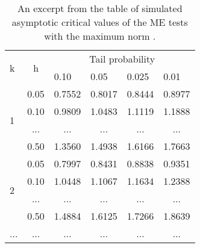 \documentclass[main.tex]{subfiles}
\begin{document}
\begin{table}[]
\centering
\begin{tabular}{|l|l|l|l|l|l|}
\hline
\multirow{2}{*}{k}        & \multicolumn{1}{c|}{\multirow{2}{*}{h}} & \multicolumn{4}{c|}{Tail probability}                                                                     \\ \cline{3-6} 
                          & \multicolumn{1}{c|}{}                   & 0.10                     & 0.05                     & 0.025                    & 0.01                     \\ \hline
\multirow{4}{*}{1}        & 0.05                                    & 0.7552                   & 0.8017                   & 0.8444                   & 0.8977                   \\ \cline{2-6} 
                          & 0.10                                    & 0.9809                   & 1.0483                   & 1.1119                   & 1.1888                   \\ \cline{2-6} 
                          & \multicolumn{1}{c|}{...}                & \multicolumn{1}{c|}{...} & \multicolumn{1}{c|}{...} & \multicolumn{1}{c|}{...} & \multicolumn{1}{c|}{...} \\ \cline{2-6} 
                          & 0.50                                    & 1.3560                   & 1.4938                   & 1.6166                   & 1.7663                   \\ \hline
\multirow{4}{*}{2}        & 0.05                                    & 0.7997                   & 0.8431                   & 0.8838                   & 0.9351                   \\ \cline{2-6} 
                          & 0.10                                    & 1.0448                   & 1.1067                   & 1.1634                   & 1.2388                   \\ \cline{2-6} 
                          & \multicolumn{1}{c|}{...}                & \multicolumn{1}{c|}{...} & \multicolumn{1}{c|}{...} & \multicolumn{1}{c|}{...} & \multicolumn{1}{c|}{...} \\ \cline{2-6} 
                          & 0.50                                    & 1.4884                   & 1.6125                   & 1.7266                   & 1.8639                   \\ \hline
\multicolumn{1}{|c|}{...} & \multicolumn{1}{c|}{...}                & \multicolumn{1}{c|}{...} & \multicolumn{1}{c|}{...} & \multicolumn{1}{c|}{...} & \multicolumn{1}{c|}{...} \\ \hline
\end{tabular}
\caption{An excerpt from the table of simulated asymptotic critical values of the
  ME tests with the maximum norm \cite{moving_estimate_test}.}
\label{table:critvals}
\end{table}
\end{document}
